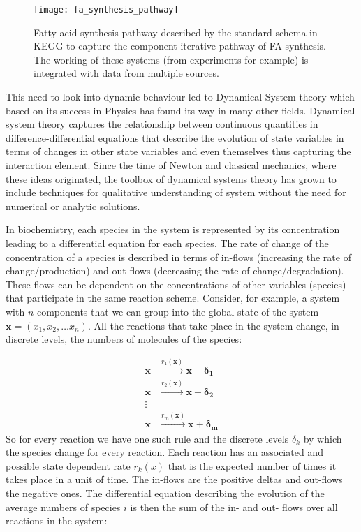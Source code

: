 \begin{figure}[htbp!]
\centering
\texttt{[image: fa\_synthesis\_pathway]}
\caption[Fatty Acid synthesis pathway]{Fatty acid synthesis pathway
  described by the standard schema in KEGG to capture the component
  iterative pathway of FA synthesis. The working of these
  systems (from experiments for example) is
  integrated with data from multiple sources.}
\label{fig:fa_synthesis_pathway}
\end{figure}

This need to look into dynamic behaviour led to Dynamical System
theory which based on its success in Physics has found its way in many
other fields. Dynamical system theory captures the relationship
between continuous quantities in difference-differential equations
that describe the evolution of state variables in terms of changes
in other state variables and even themselves thus capturing the
interaction element. Since the time of Newton and classical mechanics,
where these ideas originated, the toolbox of dynamical systems theory
has grown to include techniques for qualitative understanding of
system without the need for numerical or analytic solutions.

In biochemistry, each species in the system is represented by its
concentration leading to a differential equation for each species. The
rate of change of the concentration of a species is described in terms
of in-flows (increasing the rate of change/production) and out-flows
(decreasing the rate of change/degradation). These flows can be
dependent on the concentrations of other variables (species) that
participate in the same reaction scheme. Consider, for example, a
system with $n$ components that we can group into the global state of
the system $\mathbf{x} = (x_1, x_2, \dots x_n)$. All the reactions
that take place in the system change, in discrete levels, the numbers
of molecules of the species:

\begin{align*}
\mathbf{x} &\overset{r_1(\mathbf{x})}{\longrightarrow} \mathbf{x} +
\mathbf{\delta_1}\\
\mathbf{x} &\overset{r_2(\mathbf{x})}{\longrightarrow} \mathbf{x} +
\mathbf{\delta_2}\\
\vdots \\
\mathbf{x} &\overset{r_m(\mathbf{x})}{\longrightarrow} \mathbf{x} +
\mathbf{\delta_m}
\end{align*}
So for every reaction we have one such rule and the
discrete levels $\delta_k$ by which the species change for every reaction. Each
reaction has an associated and possible state dependent rate $r_k(x)$
that is the expected number of times it takes place in a
unit of time. The in-flows are the positive deltas and out-flows the negative
ones. The differential equation describing the evolution of the average numbers
of  species $i$ is then the sum of the in- and out- flows
over all reactions in the system:

